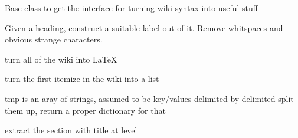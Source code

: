 \documentclass[a4paper,10pt,english]{sphinxmanual}
\begin{document}
\begin{fulllineitems}
\label{sourcecodedoc:wikiParser.wikiParser}
Base class to get the interface for turning wiki syntax into useful stuff

\begin{fulllineitems}
\label{sourcecodedoc:wikiParser.wikiParser.constructLabel}
Given a heading, construct a suitable label out of it.
Remove whitspaces and obvious strange characters.

\end{fulllineitems}


\begin{fulllineitems}
\label{sourcecodedoc:wikiParser.wikiParser.getLaTeX}
turn all of the wiki into LaTeX

\end{fulllineitems}


\begin{fulllineitems}
\label{sourcecodedoc:wikiParser.wikiParser.getList}
turn the first itemize in the wiki into a list

\end{fulllineitems}


\begin{fulllineitems}
\label{sourcecodedoc:wikiParser.wikiParser.getListAsDict}
tmp is an aray of strings, assumed to be key/values delimited by delimited
split them up, return a proper dictionary for that

\end{fulllineitems}


\begin{fulllineitems}
\label{sourcecodedoc:wikiParser.wikiParser.getSection}
extract the section with title at level


\end{fulllineitems}
\end{fulllineitems}
\end{document}
